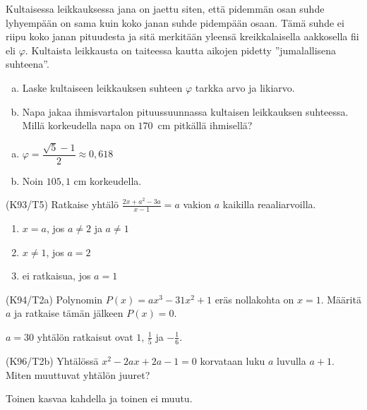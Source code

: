 \begin{tehtava}
    Kultaisessa leikkauksessa jana on jaettu siten, että pidemmän osan suhde lyhyempään on sama kuin koko janan suhde pidempään osaan. Tämä suhde ei riipu koko janan pituudesta ja sitä merkitään yleensä kreikkalaisella aakkosella fii eli $\varphi$. Kultaista leikkausta on taiteessa kautta aikojen pidetty ''jumalallisena suhteena''.
		\begin{enumerate}[a)]
            \item Laske kultaiseen leikkauksen suhteen $\varphi$ tarkka arvo ja likiarvo.
            \item Napa jakaa ihmisvartalon pituussuunnassa kultaisen leikkauksen suhteessa. Millä korkeudella napa on $170$~cm pitkällä ihmisellä?
        \end{enumerate}
    \begin{vastaus}
        \begin{enumerate}[a)]
            \item $ \varphi = \dfrac{\sqrt{5}-1}{2} \approx 0,618$
            \item Noin $105,1$ cm korkeudella.
        \end{enumerate}
    \end{vastaus}
\end{tehtava}

\begin{tehtava}
(K93/T5) Ratkaise yhtälö
        $\frac{2x+a^2-3a}{x-1}=a$ vakion $a$ kaikilla reaaliarvoilla.
\begin{vastaus}
        \begin{enumerate}
         \item{$x=a$, jos $a \neq 2$ ja $a \neq 1$}
         \item{$x\neq 1$, jos $a=2$}
         \item{ei ratkaisua, jos $a=1$}
        \end{enumerate}
    \end{vastaus}
\end{tehtava}

\begin{tehtava}
(K94/T2a) Polynomin $P(x)=ax^3-31x^2+1$ eräs nollakohta on $x=1$. Määritä $a$ ja ratkaise tämän jälkeen $P(x)=0$.
\begin{vastaus}
      $a=30$ yhtälön ratkaisut ovat $1$, $\frac{1}{5}$ ja $-\frac{1}{6}$.
    \end{vastaus}
\end{tehtava}

\begin{tehtava}
(K96/T2b) Yhtälössä $x^2-2ax+2a-1=0$ korvataan luku $a$ luvulla $a+1$. Miten muuttuvat yhtälön juuret?
\begin{vastaus}
     Toinen kasvaa kahdella ja toinen ei muutu.
    \end{vastaus}
\end{tehtava}

